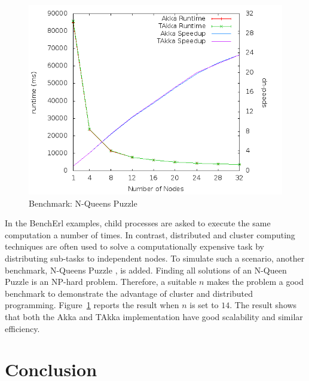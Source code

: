 \begin{figure}[h]
     \begin{center}
            \includegraphics[scale=0.30]{efficiency/NQueens.png}
    \end{center}
    \caption{Benchmark: N-Queens Puzzle}
   \label{nqueens_efficiency}
\end{figure}

In the BenchErl examples, child processes are asked to 
execute the same computation a number of times.  In contrast, distributed and 
cluster computing techniques are often used to solve a computationally 
expensive task by distributing sub-tasks to independent nodes.  To simulate 
such a scenario, another benchmark, N-Queens Puzzle \cite{wiki:nqueens}, is added. 
Finding all solutions of an N-Queen Puzzle is an NP-hard problem.  Therefore, a 
suitable $n$ makes the problem a good benchmark to demonstrate the advantage of 
cluster and distributed programming.  Figure~\ref{nqueens_efficiency}
reports the result when $n$ is set to $14$.  The result shows that both the Akka and 
TAkka implementation have good scalability and similar efficiency.





\section{Conclusion}
\label{conclusion}


